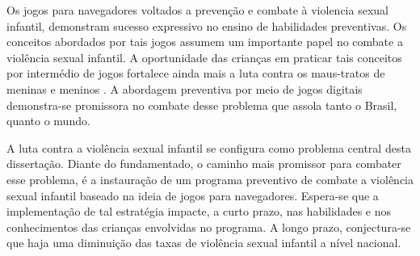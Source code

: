 Os jogos para navegadores voltados a prevenção e combate à violencia sexual infantil, demonstram sucesso expressivo no ensino de habilidades preventivas. Os conceitos abordados por tais jogos assumem um importante papel no combate a violência sexual infantil.
A oportunidade das crianças em praticar tais conceitos por intermédio de jogos fortalece ainda mais a luta contra os maus-tratos de meninas e meninos \cite{collin2013lessons}. A abordagem preventiva por meio de jogos digitais demonstra-se promissora no combate desse problema que assola tanto o Brasil, quanto o mundo. 


A luta contra a violência sexual infantil se configura como problema central desta dissertação. Diante do fundamentado, o caminho mais promissor para combater esse problema, é a instauração de um programa preventivo de combate a violência sexual infantil baseado na ideia de jogos para navegadores. Espera-se que a implementação de tal estratégia impacte, a curto prazo, nas habilidades e nos conhecimentos das crianças envolvidas no programa. A longo prazo, conjectura-se que haja uma diminuição das taxas de violência sexual infantil a nível nacional. 








